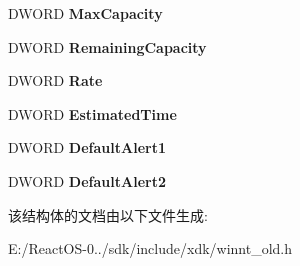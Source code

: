 \begin{DoxyCompactItemize}
D\+W\+O\+RD {\bfseries Max\+Capacity}
\item 
\mbox{\label{struct___s_y_s_t_e_m___b_a_t_t_e_r_y___s_t_a_t_e_a5709ca1b53c589bc32366c725c67427c}} 
D\+W\+O\+RD {\bfseries Remaining\+Capacity}
\item 
\mbox{\label{struct___s_y_s_t_e_m___b_a_t_t_e_r_y___s_t_a_t_e_a5529b2fdae94680bb37fe170f411be0e}} 
D\+W\+O\+RD {\bfseries Rate}
\item 
\mbox{\label{struct___s_y_s_t_e_m___b_a_t_t_e_r_y___s_t_a_t_e_a92c34d92c8cb0495d734e77f4c1aef8e}} 
D\+W\+O\+RD {\bfseries Estimated\+Time}
\item 
\mbox{\label{struct___s_y_s_t_e_m___b_a_t_t_e_r_y___s_t_a_t_e_a494a421202106da0623994f390fdb4a3}} 
D\+W\+O\+RD {\bfseries Default\+Alert1}
\item 
\mbox{\label{struct___s_y_s_t_e_m___b_a_t_t_e_r_y___s_t_a_t_e_a40b02e8e20516db09812e8f54aad701b}} 
D\+W\+O\+RD {\bfseries Default\+Alert2}
\end{DoxyCompactItemize}


该结构体的文档由以下文件生成\+:\begin{DoxyCompactItemize}
\item 
E\+:/\+React\+O\+S-\/0../sdk/include/xdk/winnt\+\_\+old.\+h\end{DoxyCompactItemize}
